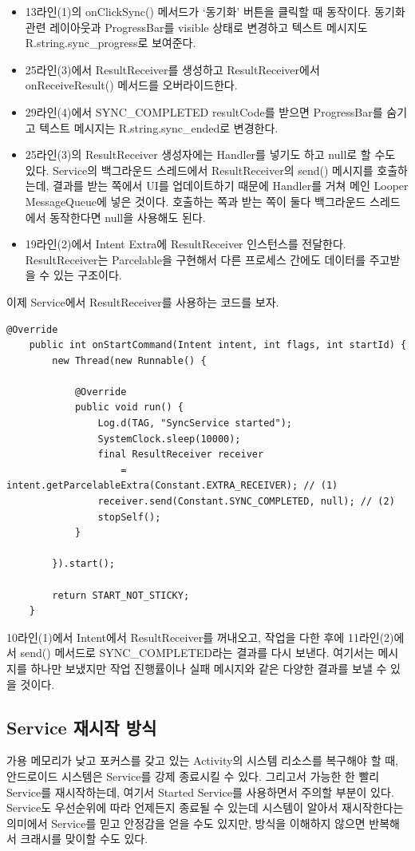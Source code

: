 \begin{itemize}
\item 13라인(1)의 onClickSync() 메서드가 `동기화' 버튼을 클릭할 때 동작이다. 동기화 관련 레이아웃과 ProgressBar를 visible 상태로 변경하고 텍스트 메시지도 R.string.sync\_progress로 보여준다.
\item 25라인(3)에서 ResultReceiver를 생성하고 ResultReceiver에서 onReceiveResult() 메서드를 오버라이드한다. 
\item 29라인(4)에서 SYNC\_COMPLETED resultCode를 받으면 ProgressBar를 숨기고 텍스트 메시지는 R.string.sync\_ended로 변경한다. 
\item 25라인(3)의 ResultReceiver 생성자에는 Handler를 넣기도 하고 null로 할 수도 있다. Service의 백그라운드 스레드에서 ResultReceiver의 send() 메시지를 호출하는데, 결과를 받는 쪽에서 UI를 업데이트하기 때문에 Handler를 거쳐 메인 Looper MessageQueue에 넣은 것이다. 호출하는 쪽과 받는 쪽이 둘다 백그라운드 스레드에서 동작한다면 null을 사용해도 된다.
\item 19라인(2)에서 Intent Extra에 ResultReceiver 인스턴스를 전달한다. ResultReceiver는 Parcelable을 구현해서 다른 프로세스 간에도 데이터를 주고받을 수 있는 구조이다.
\end{itemize}

이제 Service에서 ResultReceiver를 사용하는 코드를 보자.
\begin{lstlisting}[frame=single]
	@Override
	public int onStartCommand(Intent intent, int flags, int startId) {
   		new Thread(new Runnable() {
      
      		@Override
     		public void run() {
         		Log.d(TAG, "SyncService started");
         		SystemClock.sleep(10000);
         		final ResultReceiver receiver 
         			= intent.getParcelableExtra(Constant.EXTRA_RECEIVER); // (1)
         		receiver.send(Constant.SYNC_COMPLETED, null); // (2)
         		stopSelf();
     		}

   		}).start();
   
   		return START_NOT_STICKY;
	}
\end{lstlisting}	
10라인(1)에서 Intent에서 ResultReceiver를 꺼내오고, 작업을 다한 후에 11라인(2)에서 send() 메서드로 SYNC\_COMPLETED라는 결과를 다시 보낸다. 여기서는 메시지를 하나만 보냈지만 작업 진행률이나 실패 메시지와 같은 다양한 결과를 보낼 수 있을 것이다.

\subsection{Service 재시작 방식}
가용 메모리가 낮고 포커스를 갖고 있는 Activity의 시스템 리소스를 복구해야 할 때, 안드로이드 시스템은 Service를 강제 종료시킬 수 있다. 
그리고서 가능한 한 빨리 Service를 재시작하는데, 여기서 Started Service를 사용하면서 주의할 부분이 있다.
Service도 우선순위에 따라 언제든지 종료될 수 있는데 시스템이 알아서 재시작한다는 의미에서 Service를 믿고 안정감을 얻을 수도 있지만, 방식을 이해하지 않으면 반복해서 크래시를 맞이할 수도 있다.\\


